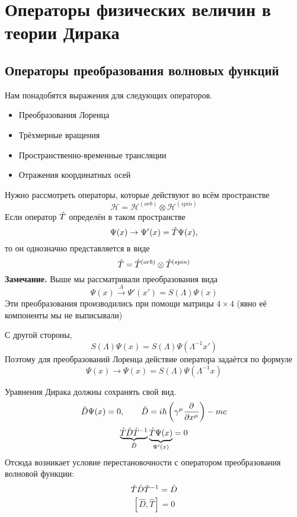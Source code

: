 \section{Операторы физических величин в теории Дирака}


\subsection{Операторы преобразования волновых функций}

Нам понадобятся выражения для следующих операторов.
\begin{itemize}
  \item Преобразования Лоренца
  \item Трёхмерные вращения
  \item Пространственно-временные трансляции
  \item Отражения координатных осей
\end{itemize}

Нужно рассмотреть операторы, которые действуют во всём пространстве
\def \H{\mathcal H}
$$
    \H = \H^{(orb)} \otimes \H^{(spin)}
$$
Если оператор $\Hat T$ определён в таком пространстве
$$
    \Psi(x) \to \Psi'(x) = \Hat T \Psi(x),
$$
то он однозначно представляется в виде
$$
    \Hat T = \Hat T^{(orb)} \otimes \Hat T^{(spin)}
$$
\textbf{Замечание.} Выше мы рассматривали преобразования вида
$$
    \Psi(x) \overset{\Lambda}{\to} \Psi'(x') = S(\Lambda) \Psi(x)
$$
Эти преобразования производились при помощи матрицы $4 \times 4$ (явно её компоненты мы не выписывали)

С другой стороны,
$$
    S(\Lambda) \Psi(x) = S(\Lambda) \Psi(\Lambda^{-1} x')
$$
Поэтому для преобразований Лоренца действие оператора задаётся по формуле
$$
    \Psi(x) \to \Psi(x) = S(\Lambda) \Psi(\Lambda^{-1} x)
$$

Уравнения Дирака должны сохранять свой вид.
$$
    \Hat D \Psi(x) = 0, \qquad \Hat D = i \hbar \left(
        \gamma^{\mu} \dfrac{\partial}{\partial x^{\mu}}
    \right) - mc
$$
$$
    \underbrace{\Hat T \hat D \hat T^{-1}}_{\hat D}\underbrace{\hat T \Psi(x)}_{\Psi'(x)} = 0
$$
Отсюда возникает условие перестановочности с оператором преобразования волновой функции:
$$
    \Hat T \Hat D \hat T^{-1} = \hat D
$$
$$
\boxed{
    [\hat D, \hat T] = 0
}
$$

